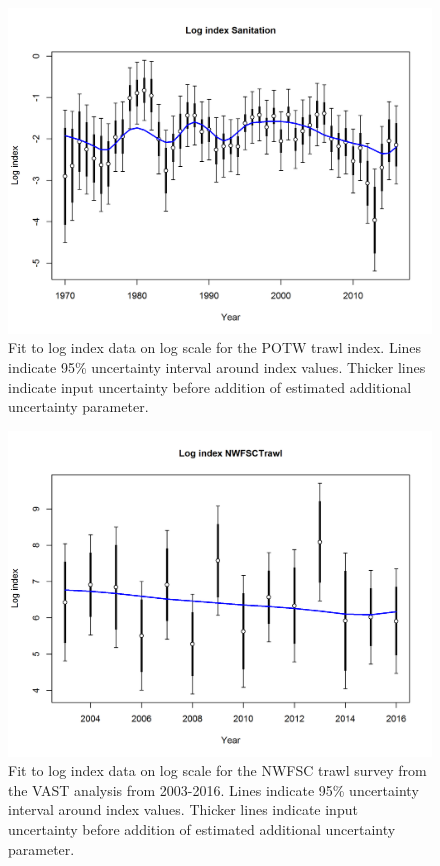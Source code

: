 \documentclass[12pt,]{article}
\begin{document}
\begin{figure}[htbp]
\centering
\includegraphics{r4ss/plots_mod1/index5_logcpuefit_Sanitation.png}
\caption{Fit to log index data on log scale for the POTW trawl index.
Lines indicate 95\% uncertainty interval around index values. Thicker
lines indicate input uncertainty before addition of estimated additional
uncertainty parameter. \label{fig:index5_logcpuefit_Sanitation}}
\end{figure}

\begin{figure}[htbp]
\centering
\includegraphics{r4ss/plots_mod1/index5_logcpuefit_NWFSCtrawl.png}
\caption{Fit to log index data on log scale for the NWFSC trawl survey
from the VAST analysis from 2003-2016. Lines indicate 95\% uncertainty
interval around index values. Thicker lines indicate input uncertainty
before addition of estimated additional uncertainty parameter.
\label{fig:index5_logcpuefit_NWFSCtrawl}}
\end{figure}
\end{document}
